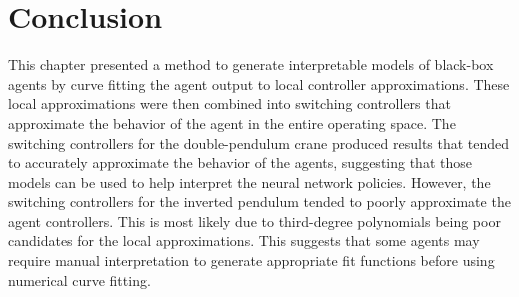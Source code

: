 \section{Conclusion}
This chapter presented a method to generate interpretable models of black-box agents by curve fitting the agent output to local controller approximations. These local approximations were then combined into switching controllers that approximate the behavior of the agent in the entire operating space. The switching controllers for the double-pendulum crane produced results that tended to accurately approximate the behavior of the agents, suggesting that those models can be used to help interpret the neural network policies.
%
However, the switching controllers for the inverted pendulum tended to poorly approximate the agent controllers. This is most likely due to third-degree polynomials being poor candidates for the local approximations. This suggests that some agents may require manual interpretation to generate appropriate fit functions before using numerical curve fitting.